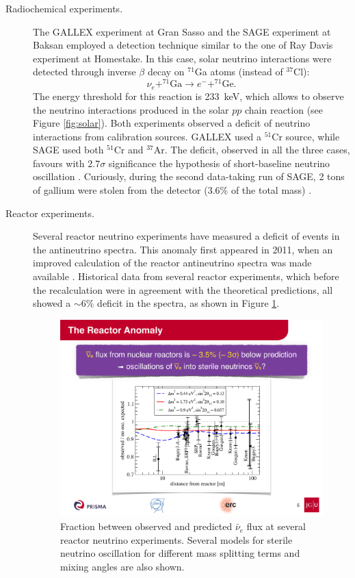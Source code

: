 \begin{description}
    \item[Radiochemical experiments.] The GALLEX experiment at Gran Sasso and the SAGE experiment at Baksan employed a detection technique similar to the one of Ray Davis experiment at Homestake. In this case, solar neutrino interactions were detected through inverse $\beta$ decay on $^{71}$Ga atoms (instead of $^{37}$Cl):
    \begin{equation}
        \nu_e + ^{71}\mathrm{Ga} \rightarrow e^- + ^{71}\mathrm{Ge}.
    \end{equation}
    The energy threshold for this reaction is 233~keV, which allows to observe the neutrino interactions produced in the solar $pp$ chain reaction (see Figure \ref{fig:solar}). Both experiments observed a deficit of neutrino interactions from calibration sources. GALLEX used a $^{51}$Cr source, while SAGE used both $^{51}$Cr and $^{37}$Ar. The deficit, observed in all the three cases, favours with $2.7\sigma$ significance the hypothesis of short-baseline neutrino oscillation \cite{Giunti:2010zu}. Curiously, during the second data-taking run of SAGE, 2 tons of gallium were stolen from the detector (3.6\% of the total mass) \cite{Abdurashitov:1999zd}.
    
    \item[Reactor experiments.] Several reactor neutrino experiments have measured a deficit of events in the antineutrino spectra. This anomaly first appeared in 2011, when an improved calculation of the reactor antineutrino spectra was made available \cite{Mueller:2011nm}. Historical data from several reactor experiments, which before the recalculation were in agreement with the theoretical predictions, all showed a $\sim6\%$ deficit in the spectra, as shown in Figure \ref{fig:reactor}. 
    
    \begin{figure}[htbp]
      \centering
      \captionsetup{margin=1.3cm}
      \includegraphics[width=0.75\linewidth]{figures/reactor.pdf}
      \caption{Fraction between observed and predicted $\bar{\nu}_{e}$ flux at several reactor neutrino experiments. Several models for sterile neutrino oscillation for different mass splitting terms and mixing angles are also shown.}
    \label{fig:reactor}
    \end{figure}
    

\end{description}

